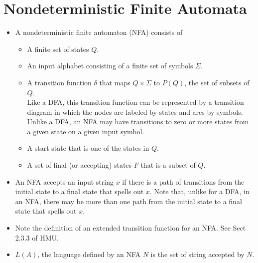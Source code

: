 \documentclass[]{article}
\begin{document}
\section{Nondeterministic Finite Automata}
  \begin{itemize}
    \item A nondeterministic finite automaton (NFA) consists of
      \begin{itemize}
        \item A finite set of states $Q$.
        \item An input alphabet consisting of a finite set of symbols $\Sigma$.
        \item A transition function $\delta$ that maps $Q \times \Sigma$ to $P(Q)$, 
        the set of subsets of $Q$. \\
        Like a DFA, this transition function can be represented by a transition 
        diagram in which the nodes are labeled by states and arcs by symbols. 
        Unlike a DFA, an NFA may have transitions to zero or more states from a 
        given state on a given input symbol.
        \item A start state that is one of the states in $Q$.
        \item A set of final (or accepting) states $F$ that is a subset of $Q$.
      \end{itemize}
    \item An NFA accepts an input string $x$ if there is a path of transitions 
    from the initial state to a final state that spells out $x$. Note that, 
    unlike for a DFA, in an NFA, there may be more than one path from the 
    initial state to a final state that spells out $x$.
    \item Note the definition of an extended transition function for an NFA. 
    See Sect 2.3.3 of HMU.
    \item $L(A)$, the language defined by an NFA $N$ is the set of string 
    accepted by $N$.
  \end{itemize}
  
\end{document}
